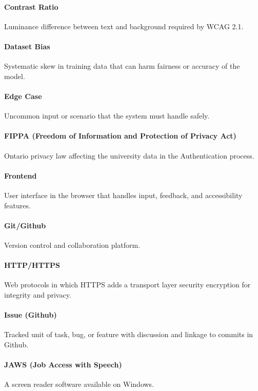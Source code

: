 \documentclass[12pt, titlepage]{article}
\begin{document}
\paragraph*{Contrast Ratio}
Luminance difference between text and background required by WCAG 2.1.

\paragraph*{Dataset Bias}
Systematic skew in training data that can harm fairness or accuracy
of the model.

\paragraph*{Edge Case}
Uncommon input or scenario that the system must handle safely.

\paragraph*{FIPPA (Freedom of Information and Protection of Privacy Act)}
Ontario privacy law affecting the university data in the Authentication process.

\paragraph*{Frontend}
User interface in the browser that handles input, feedback, and
accessibility features.

\paragraph*{Git/Github}
Version control and collaboration platform.

\paragraph*{HTTP/HTTPS}
Web protocols in which HTTPS adds a transport layer security
encryption for integrity and privacy.

\paragraph*{Issue (Github)}
Tracked unit of task, bug, or feature with discussion and linkage to
commits in Github.

\paragraph*{JAWS (Job Access with Speech)}
A screen reader software available on Windows.
\end{document}
